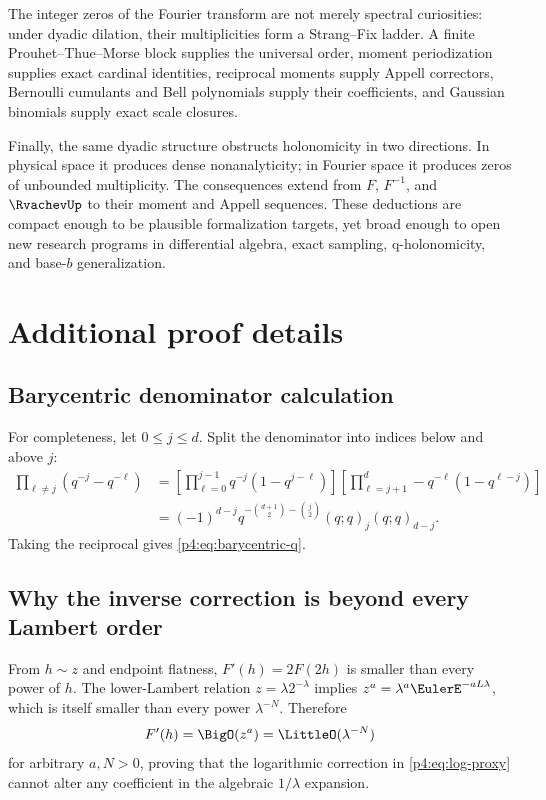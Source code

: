 \documentclass[11pt]{article}
\numberwithin{equation}{section}
\theoremstyle{definition}
\theoremstyle{remark}
\begin{document}
The integer zeros of the Fourier transform are not merely spectral curiosities: under dyadic dilation, their multiplicities form a Strang--Fix ladder.  A finite Prouhet--Thue--Morse block supplies the universal order, moment periodization supplies exact cardinal identities, reciprocal moments supply Appell correctors, Bernoulli cumulants and Bell polynomials supply their coefficients, and Gaussian binomials supply exact scale closures.

Finally, the same dyadic structure obstructs holonomicity in two directions.  In physical space it produces dense nonanalyticity; in Fourier space it produces zeros of unbounded multiplicity.  The consequences extend from $F$, $F^{-1}$, and $\RvachevUp$ to their moment and Appell sequences.  These deductions are compact enough to be plausible formalization targets, yet broad enough to open new research programs in differential algebra, exact sampling, q-holonomicity, and base-$b$ generalization.

\appendix
\renewcommand*{\theHsection}{\arabic{part}.\arabic{section}}

\section{Additional proof details}
\label{p4:app:proof-details}

\subsection{Barycentric denominator calculation}
For completeness, let $0\le j\le d$.  Split the denominator into indices below and above $j$:
\begin{align*}
 \prod_{\ell\ne j}(q^{-j}-q^{-\ell})
 &=\left[\prod_{\ell=0}^{j-1}q^{-j}(1-q^{j-\ell})\right]
   \left[\prod_{\ell=j+1}^{d}-q^{-\ell}(1-q^{\ell-j})\right]\\
 &=(-1)^{d-j}q^{-\binom{d+1}{2}-\binom j2}
   (q;q)_j(q;q)_{d-j}.
\end{align*}
Taking the reciprocal gives \eqref{p4:eq:barycentric-q}.

\subsection{Why the inverse correction is beyond every Lambert order}
From $h\sim z$ and endpoint flatness, $F'(h)=2F(2h)$ is smaller than every power of $h$.  The lower-Lambert relation $z=\lambda2^{-\lambda}$ implies
$z^a=\lambda^a\EulerE^{-aL\lambda}$, which is itself smaller than every power $\lambda^{-N}$.  Therefore
\[
 F'(h)=\BigO(z^a)=\LittleO(\lambda^{-N})
\]
for arbitrary $a,N>0$, proving that the logarithmic correction in \eqref{p4:eq:log-proxy} cannot alter any coefficient in the algebraic $1/\lambda$ expansion.
\end{document}
